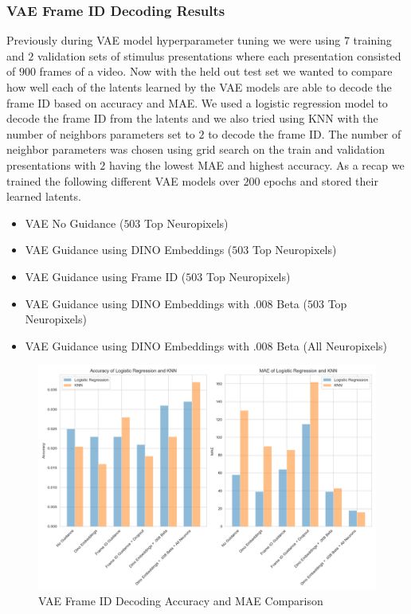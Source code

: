 \documentclass[12pt, letterpaper]{article}
\begin{document}
\subsubsection{VAE Frame ID Decoding Results}
\label{subsubsec:vae_frame_id_decoding}
Previously during VAE model hyperparameter tuning we were using $7$ training and $2$ validation sets of stimulus presentations where each presentation consisted of $900$ frames of a video. Now with the held out test set we wanted to compare how well each of the latents learned by the VAE models are able to decode the frame ID based on accuracy and MAE. We used a logistic regression model to decode the frame ID from the latents and we also tried using KNN with the number of neighbors parameters set to $2$ to decode the frame ID. The number of neighbor parameters was chosen using grid search on the train and validation presentations with $2$ having the lowest MAE and highest accuracy. As a recap we trained the following different VAE models over $200$ epochs and stored their learned latents. 

\begin{itemize}
    \item VAE No Guidance ($503$ Top Neuropixels)
    \item VAE Guidance using DINO Embeddings ($503$ Top Neuropixels)
    \item VAE Guidance using Frame ID ($503$ Top Neuropixels)
    \item VAE Guidance using DINO Embeddings with .008 Beta ($503$ Top Neuropixels)
    \item VAE Guidance using DINO Embeddings with .008 Beta (All Neuropixels)
\end{itemize}

\begin{figure}[H]
    \centering
    \includegraphics[width=1.0\textwidth]{vae_models_logistic_knn_comparison.png}
    \caption{VAE Frame ID Decoding Accuracy and MAE Comparison}
    \label{fig:vae_frame_id_decoding_comparison}
\end{figure}
\end{document}
